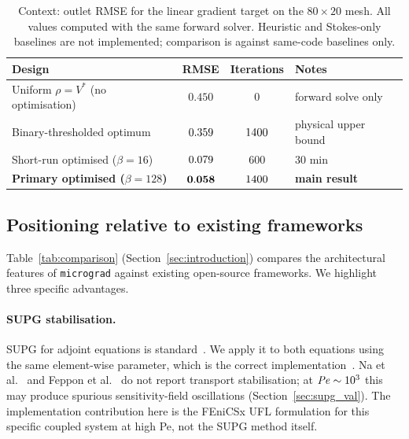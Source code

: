 \begin{table}[h]
\centering\small
\caption{Context: outlet RMSE for the linear gradient target
         on the $80\times20$ mesh.
         All values computed with the same forward solver.
         Heuristic and Stokes-only baselines are not implemented;
         comparison is against same-code baselines only.}
\label{tab:context}
\begin{tabular}{@{}lccl@{}}
\toprule
Design & RMSE & Iterations & Notes \\
\midrule
Uniform $\rho=V^*$ (no optimisation) & $0.450$ & 0 & forward solve only \\
Binary-thresholded optimum & $0.359$ & $1400$ & physical upper bound \\
Short-run optimised ($\beta=16$) & $0.079$ & 600 & 30 min \\
\textbf{Primary optimised ($\beta=128$)} & $\mathbf{0.058}$ & $1400$ & \textbf{main result} \\
\bottomrule
\end{tabular}
\end{table}

\subsection{Positioning relative to existing frameworks}
\label{sec:positioning}
Table~\ref{tab:comparison} (Section~\ref{sec:introduction}) compares
the architectural features of \texttt{micrograd} against existing
open-source frameworks.
We highlight three specific advantages.

\paragraph{SUPG stabilisation.}
SUPG for adjoint equations is standard~\cite{donea2003,giles2000}.
We apply it to both equations using the same element-wise parameter,
which is the correct implementation~\cite{brooks1982}.
Na et al.~\cite{na2022} and Feppon et al.~\cite{feppon2024}
do not report transport stabilisation; at $\mathit{Pe}\sim10^3$
this may produce spurious sensitivity-field oscillations
(Section~\ref{sec:supg_val}).
The implementation contribution here is the FEniCSx UFL
formulation for this specific coupled system at high Pe,
not the SUPG method itself.

